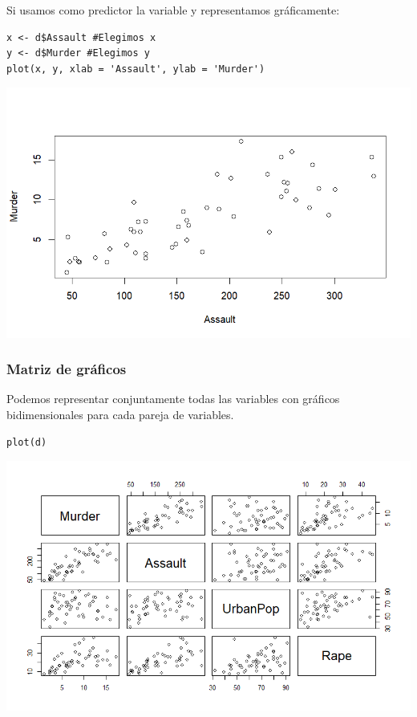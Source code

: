 \newpage

\begin{figure}
\end{figure}

Si usamos como predictor la variable  y representamos gráficamente:

\begin{lstlisting}
x <- d$Assault #Elegimos x
y <- d$Murder #Elegimos y
plot(x, y, xlab = 'Assault', ylab = 'Murder')
\end{lstlisting}

\begin{center}
\includegraphics[scale=0.7]{"Temas/Imágenes/Tema 2/000010"}
\end{center}

\subsubsection{Matriz de gráficos}
Podemos representar conjuntamente todas las variables con gráficos bidimensionales para cada pareja de variables.

\begin{lstlisting}
plot(d)
\end{lstlisting}

\begin{center}
\includegraphics[scale=0.7]{"Temas/Imágenes/Tema 2/000002"}
\end{center}
